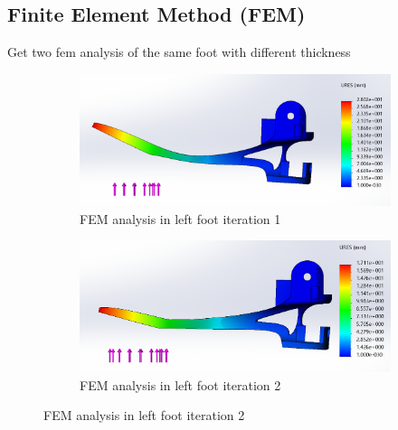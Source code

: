 
\subsection{Finite Element Method (FEM)} %
\label{sub:finite_element_method}

Get two fem analysis of the same foot with different thickness

\begin{figure}[ht]
    \centering
    \begin{subfigure}[b]{\textwidth}
        \includegraphics[width=\textwidth]{figures/fem_5N_1.PNG}
        \caption{FEM analysis in left foot iteration 1}
        \label{fig:fem_foot_iteration_1}
    \end{subfigure}

    \begin{subfigure}[b]{\textwidth}
        \includegraphics[width=\textwidth]{figures/fem_5N_2.PNG}
        \caption{FEM analysis in left foot iteration 2}
        \label{fig:fem_foot_iteration_2}
    \end{subfigure}
\end{figure}

